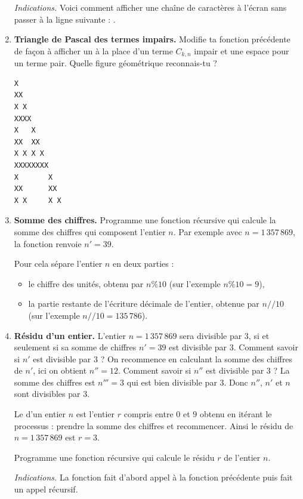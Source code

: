 \documentclass[11pt,class=report,crop=false]{standalone}
\begin{document}
\begin{activite}
\begin{enumerate}
  \emph{Indications.} Voici comment afficher une chaîne de caractères à l'écran sans passer à la ligne suivante : .
  
   \item \textbf{Triangle de Pascal des termes impairs.}
   Modifie ta fonction précédente de façon à afficher un  à la place d'un terme $C_{k,n}$ impair et une espace pour un terme pair.
   Quelle figure géométrique reconnais-tu ?
   
\begin{center} 
\begin{minipage}{0.2\textwidth} 
\begin{lstlisting}
X
XX
X X
XXXX
X   X
XX  XX
X X X X
XXXXXXXX
X       X
XX      XX
X X     X X
\end{lstlisting}
\end{minipage}
\end{center} 


   
   \item \textbf{Somme des chiffres.} Programme une fonction récursive 
   qui calcule la somme des chiffres qui composent l'entier $n$. Par exemple
   avec $n = 1\,357\,869$, la fonction renvoie $n' = 39$.
   
   Pour cela sépare l'entier $n$ en deux parties : 
   \begin{itemize}
     \item le chiffre des unités, obtenu par $n\%10$ (sur l'exemple $n\%10=9$),
     \item la partie restante de l'écriture décimale de l'entier, obtenue par $n//10$  (sur l'exemple $n//10 = 135\,786$).
   \end{itemize}
   
   \item \textbf{Résidu d'un entier.} 
   L'entier $n = 1\,357\,869$ sera divisible par $3$, si et seulement si sa somme de chiffres $n'=39$
   est divisible par $3$. Comment savoir si $n'$ est divisible par $3$ ? On recommence en calculant la somme des chiffres de $n'$, ici on obtient $n''=12$. Comment savoir si $n''$ est divisible par $3$ ? La somme des chiffres est $n'''=3$ qui est bien divisible par $3$. Donc $n''$, $n'$ et $n$ sont divisibles par $3$. 
   
   Le  d'un entier $n$ est l'entier $r$ compris entre $0$ et $9$ obtenu en itérant le processus : prendre la somme des chiffres et recommencer. Ainsi le résidu de $n = 1\,357\,869$ est $r=3$.
   
   Programme une fonction récursive  qui calcule le résidu $r$ de l'entier $n$.
   
   \emph{Indications.} La fonction  fait d'abord appel à la fonction précédente 
    puis fait un appel récursif.
\end{enumerate}

\end{activite}
\end{document}
